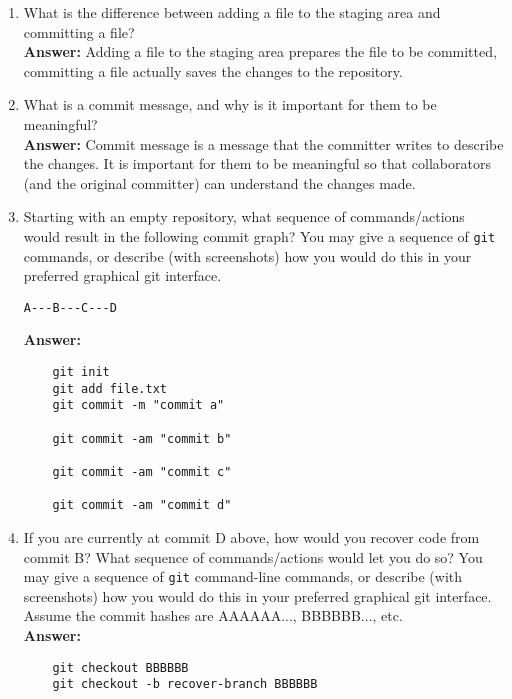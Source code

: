 \documentclass[10pt,twocolumn]{article}
\begin{document}
\begin{enumerate}
\item What is the difference between adding a file to the staging area and committing a file?\\
    \textbf{Answer:}
    Adding a file to the staging area prepares the file to be committed, committing a file actually saves the changes to the repository.

\item What is a commit message, and why is it important for them to be meaningful?\\
    \textbf{Answer:}
    Commit message is a message that the committer writes to describe the changes. It is important for them to be meaningful so that collaborators (and the original committer) can understand the changes made.

\item Starting with an empty repository, what sequence of commands/actions would result in the following commit graph? You may give a sequence of \texttt{git} commands, or describe (with screenshots) how you would do this in your preferred graphical git interface.
\begin{verbatim}
A---B---C---D
\end{verbatim}
    \textbf{Answer:}
\begin{verbatim}
    git init
    git add file.txt
    git commit -m "commit a"

    git commit -am "commit b"

    git commit -am "commit c"

    git commit -am "commit d"
\end{verbatim}


\item If you are currently at commit D above, how would you recover code from commit B? What sequence of commands/actions would let you do so? You may give a sequence of \texttt{git} command-line commands, or describe (with screenshots) how you would do this in your preferred graphical git interface. Assume the commit hashes are AAAAAA..., BBBBBB..., etc.\\
    \textbf{Answer:}
\begin{verbatim}
    git checkout BBBBBB
    git checkout -b recover-branch BBBBBB
\end{verbatim}


\end{enumerate}
\end{document}
